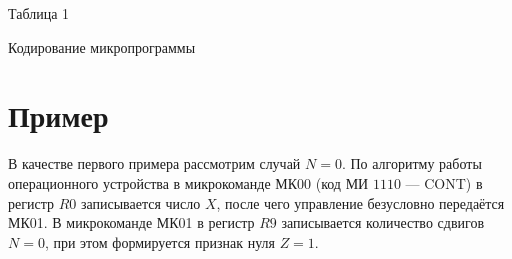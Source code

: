 \documentclass[oneside,a4paper,14pt]{extarticle}
\begin{document}
\begin{flushright}
	Таблица 1
\end{flushright}
\begin{center}
	Кодирование микропрограммы
\end{center}
\begin{table}[H]
	\centering
	\renewcommand{\arraystretch}{1.3}
	\label{tab:microcommands}
\end{table}

\newpage

\section*{Пример}
В качестве первого примера рассмотрим случай $N = 0$. По алгоритму работы операционного устройства в микрокоманде МК00 (код МИ $1110$ — CONT) в регистр $R0$ записывается число $X$, после чего управление безусловно передаётся МК01. В микрокоманде МК01 в регистр $R9$ записывается количество сдвигов $N = 0$, при этом формируется признак нуля $Z = 1$.
\end{document}
